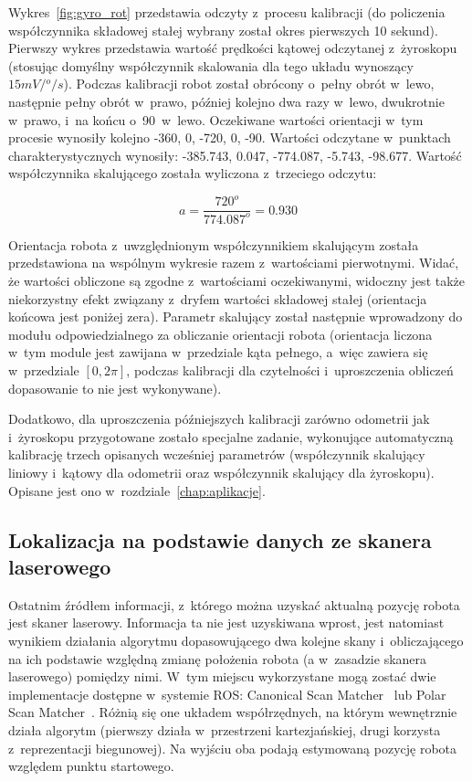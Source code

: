 Wykres~\ref{fig:gyro_rot} przedstawia odczyty z~procesu kalibracji (do
policzenia współczynnika składowej stałej wybrany został okres pierwszych 10
sekund). Pierwszy wykres przedstawia wartość prędkości kątowej odczytanej 
z~żyroskopu (stosując domyślny współczynnik skalowania dla tego układu wynoszący
$15mV/{}^o/s$). Podczas kalibracji robot został obrócony o~pełny obrót 
w~lewo, następnie pełny obrót w~prawo, później kolejno dwa razy w~lewo, dwukrotnie
w~prawo, i~na końcu o~90\textdegree~w~lewo. Oczekiwane wartości orientacji w~tym
procesie wynosiły kolejno -360\textdegree, 0\textdegree, -720\textdegree,
0\textdegree, -90\textdegree. Wartości odczytane w~punktach charakterystycznych
wynosiły: -385.743\textdegree, 0.047\textdegree, -774.087\textdegree,
-5.743\textdegree, -98.677\textdegree. Wartość współczynnika skalującego została
wyliczona z~trzeciego odczytu:

\[
a = \frac{720^o}{774.087^o} = 0.930
\]

Orientacja robota z~uwzględnionym współczynnikiem skalującym została
przedstawiona na wspólnym wykresie razem z~wartościami pierwotnymi. Widać, że
wartości obliczone są zgodne z~wartościami oczekiwanymi, widoczny jest także
niekorzystny efekt związany z~dryfem wartości składowej stałej (orientacja
końcowa jest poniżej zera). Parametr skalujący został następnie wprowadzony
do modułu odpowiedzialnego za obliczanie orientacji robota (orientacja liczona
w~tym module jest zawijana w~przedziale kąta pełnego, a~więc zawiera się 
w~przedziale $[0, 2\pi]$, podczas kalibracji dla czytelności i~uproszczenia
obliczeń dopasowanie to nie jest wykonywane).

Dodatkowo, dla uproszczenia późniejszych kalibracji zarówno odometrii jak 
i~żyroskopu przygotowane zostało specjalne zadanie, wykonujące automatyczną
kalibrację trzech opisanych wcześniej parametrów (współczynnik skalujący
liniowy i~kątowy dla odometrii oraz współczynnik skalujący dla żyroskopu).
Opisane jest ono w~rozdziale~\ref{chap:aplikacje}.

\subsection{Lokalizacja na podstawie danych ze skanera laserowego}

Ostatnim źródłem informacji, z~którego można uzyskać aktualną pozycję robota
jest skaner laserowy. Informacja ta nie jest uzyskiwana wprost, jest natomiast
wynikiem działania algorytmu dopasowującego dwa kolejne skany i~obliczającego
na ich podstawie względną zmianę położenia robota (a w~zasadzie skanera laserowego)
pomiędzy nimi. W~tym miejscu wykorzystane mogą zostać dwie implementacje
dostępne w~systemie ROS: Canonical Scan Matcher~\cite{4543181} lub Polar Scan
Matcher~\cite{laser_slam}. Różnią się one układem współrzędnych, na którym
wewnętrznie działa algorytm (pierwszy działa w~przestrzeni kartezjańskiej,
drugi korzysta z~reprezentacji biegunowej). Na wyjściu oba podają estymowaną
pozycję robota względem punktu startowego.


